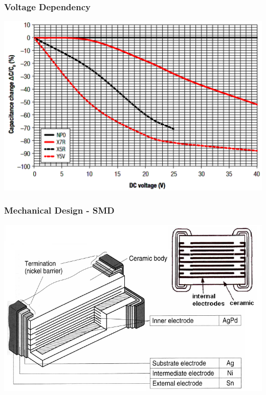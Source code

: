 \documentclass{beamer}
\begin{document}
	\begin{frame}
    \frametitle{Voltage Dependency}
		\begin{center}
			\includegraphics[scale=0.3]{obr11_napZav.png}
		\end{center}
  \end{frame}
	\begin{frame}
    \frametitle{Mechanical Design - SMD}
		\begin{center}
			\includegraphics[scale=0.45]{obr09_smdKonstrukce.png}
		\end{center}
  \end{frame}
\end{document}
